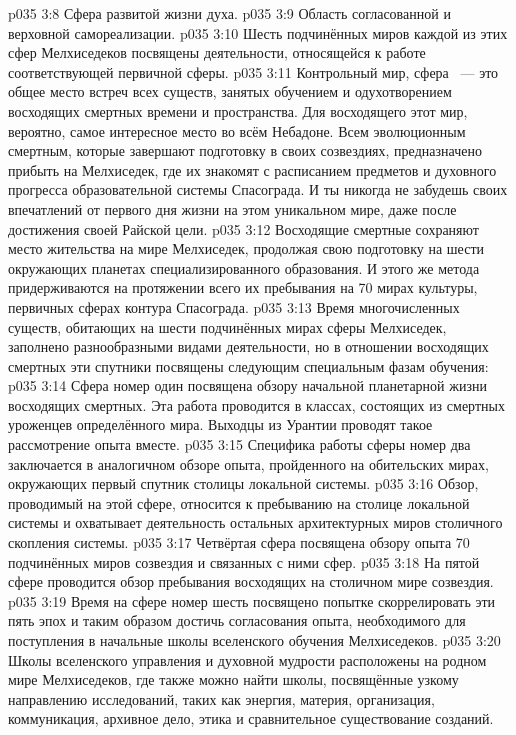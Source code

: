 \vs p035 3:8 Сфера развитой жизни духа.
\vs p035 3:9 Область согласованной и верховной самореализации.
\vs p035 3:10 \pc Шесть подчинённых миров каждой из этих сфер Мелхиседеков посвящены деятельности, относящейся к работе соответствующей первичной сферы.
\vs p035 3:11 \pc Контрольный мир, сфера ~--- это общее место встреч всех существ, занятых обучением и одухотворением восходящих смертных времени и пространства. Для восходящего этот мир, вероятно, самое интересное место во всём Небадоне. Всем эволюционным смертным, которые завершают подготовку в своих созвездиях, предназначено прибыть на Мелхиседек, где их знакомят с расписанием предметов и духовного прогресса образовательной системы Спасограда. И ты никогда не забудешь своих впечатлений от первого дня жизни на этом уникальном мире, даже после достижения своей Райской цели.
\vs p035 3:12 Восходящие смертные сохраняют место жительства на мире Мелхиседек, продолжая свою подготовку на шести окружающих планетах специализированного образования. И этого же метода придерживаются на протяжении всего их пребывания на 70 мирах культуры, первичных сферах контура Спасограда.
\vs p035 3:13 \pc Время многочисленных существ, обитающих на шести подчинённых мирах сферы Мелхиседек, заполнено разнообразными видами деятельности, но в отношении восходящих смертных эти спутники посвящены следующим специальным фазам обучения:
\vs p035 3:14 Сфера номер один посвящена обзору начальной планетарной жизни восходящих смертных. Эта работа проводится в классах, состоящих из смертных уроженцев определённого мира. Выходцы из Урантии проводят такое рассмотрение опыта вместе.
\vs p035 3:15 Специфика работы сферы номер два заключается в аналогичном обзоре опыта, пройденного на обительских мирах, окружающих первый спутник столицы локальной системы.
\vs p035 3:16 Обзор, проводимый на этой сфере, относится к пребыванию на столице локальной системы и охватывает деятельность остальных архитектурных миров столичного скопления системы.
\vs p035 3:17 Четвёртая сфера посвящена обзору опыта 70 подчинённых миров созвездия и связанных с ними сфер.
\vs p035 3:18 На пятой сфере проводится обзор пребывания восходящих на столичном мире созвездия.
\vs p035 3:19 Время на сфере номер шесть посвящено попытке скоррелировать эти пять эпох и таким образом достичь согласования опыта, необходимого для поступления в начальные школы вселенского обучения Мелхиседеков.
\vs p035 3:20 \pc Школы вселенского управления и духовной мудрости расположены на родном мире Мелхиседеков, где также можно найти школы, посвящённые узкому направлению исследований, таких как энергия, материя, организация, коммуникация, архивное дело, этика и сравнительное существование созданий.
